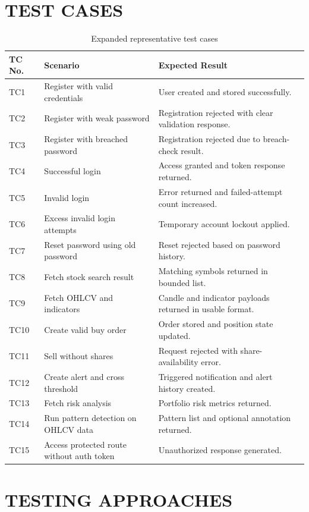 \documentclass[12pt,a4paper]{report}
\begin{document}
\section{TEST CASES}
\begin{table}[H]
\centering
\caption{Expanded representative test cases}
\begin{tabularx}{\textwidth}{>{\raggedright\arraybackslash}p{0.8in} >{\raggedright\arraybackslash}p{2.25in} X}
\toprule
\textbf{TC No.} & \textbf{Scenario} & \textbf{Expected Result} \\
\midrule
TC1 & Register with valid credentials & User created and stored successfully. \\
TC2 & Register with weak password & Registration rejected with clear validation response. \\
TC3 & Register with breached password & Registration rejected due to breach-check result. \\
TC4 & Successful login & Access granted and token response returned. \\
TC5 & Invalid login & Error returned and failed-attempt count increased. \\
TC6 & Excess invalid login attempts & Temporary account lockout applied. \\
TC7 & Reset password using old password & Reset rejected based on password history. \\
TC8 & Fetch stock search result & Matching symbols returned in bounded list. \\
TC9 & Fetch OHLCV and indicators & Candle and indicator payloads returned in usable format. \\
TC10 & Create valid buy order & Order stored and position state updated. \\
TC11 & Sell without shares & Request rejected with share-availability error. \\
TC12 & Create alert and cross threshold & Triggered notification and alert history created. \\
TC13 & Fetch risk analysis & Portfolio risk metrics returned. \\
TC14 & Run pattern detection on OHLCV data & Pattern list and optional annotation returned. \\
TC15 & Access protected route without auth token & Unauthorized response generated. \\
\bottomrule
\end{tabularx}
\end{table}

\section{TESTING APPROACHES}
\end{document}
